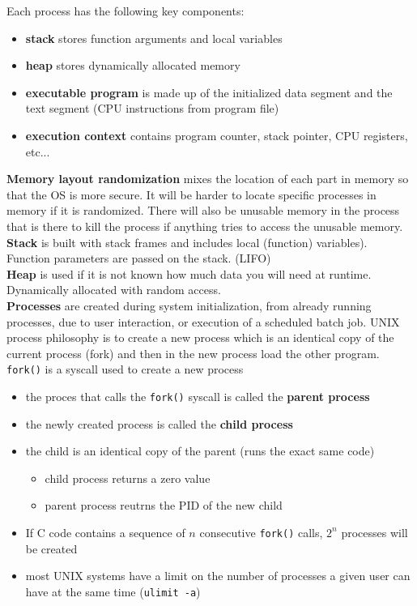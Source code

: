 \documentclass{article}
\begin{document}
    \noindent Each process has the following key components: 

    \begin{itemize}
    \item \textbf{stack} stores function arguments and local variables
    \item \textbf{heap} stores dynamically allocated memory
    \item \textbf{executable program} is made up of the initialized data segment and the text segment (CPU instructions from program file)
    \item \textbf{execution context} contains program counter, stack pointer, CPU registers, etc...
    \end{itemize}

    \noindent \textbf{Memory layout randomization} mixes the location of each part in memory so that the OS is more secure. It will be harder to locate specific processes in memory if it is randomized. There will also be unusable memory in the process that is there to kill the process if anything tries to access the unusable memory. \\

    \noindent \textbf{Stack} is built with stack frames and includes local (function) variables). Function parameters are passed on the stack. (LIFO) \\

    \noindent \textbf{Heap} is used if it is not known how much data you will need at runtime. Dynamically allocated with random access. \\ 

    \noindent \textbf{Processes} are created during system initialization, from already running processes, due to user interaction, or execution of a scheduled batch job. UNIX process philosophy is to create a new process which is an identical copy of the current process (fork) and then in the new process load the other program. \\

    \noindent \texttt{fork()} is a syscall used to create a new process

    \begin{itemize}
    \item the proces that calls the \texttt{fork()} syscall is called the \textbf{parent process}
    \item the newly created process is called the \textbf{child process}
    \item the child is an identical copy of the parent (runs the exact same code)
    \begin{itemize}
    \item child process returns a zero value
    \item parent process reutrns the PID of the new child
    \end{itemize}
    \item If C code contains a sequence of $n$ consecutive \texttt{fork()} calls, $2^n$ processes will be created
    \item most UNIX systems have a limit on the number of processes a given user can have at the same time (\texttt{ulimit -a})
    \end{itemize}
    
\end{document}
